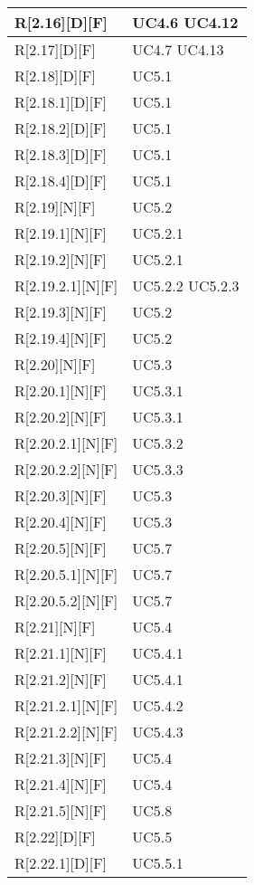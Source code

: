 \begin{longtable}{X | X}
\hline
R[2.16][D][F] & UC4.6 \newline UC4.12 \\
\hline
R[2.17][D][F] & UC4.7 \newline UC4.13 \\
\hline
R[2.18][D][F] & UC5.1 \\
\hline
R[2.18.1][D][F] & UC5.1 \\
\hline
R[2.18.2][D][F] & UC5.1 \\
\hline
R[2.18.3][D][F] & UC5.1 \\
\hline
R[2.18.4][D][F] & UC5.1 \\
\hline
R[2.19][N][F] & UC5.2 \\
\hline
R[2.19.1][N][F] & UC5.2.1 \\
\hline
R[2.19.2][N][F] & UC5.2.1 \\
\hline
R[2.19.2.1][N][F] & UC5.2.2 \newline UC5.2.3 \\
\hline
R[2.19.3][N][F] & UC5.2 \\
\hline
R[2.19.4][N][F] & UC5.2 \\
\hline
R[2.20][N][F] & UC5.3 \\
\hline
R[2.20.1][N][F] & UC5.3.1 \\
\hline
R[2.20.2][N][F] & UC5.3.1 \\
\hline
R[2.20.2.1][N][F] & UC5.3.2 \\
\hline
R[2.20.2.2][N][F] & UC5.3.3 \\
\hline
R[2.20.3][N][F] & UC5.3 \\
\hline
R[2.20.4][N][F] & UC5.3 \\
\hline
R[2.20.5][N][F] & UC5.7 \\
\hline
R[2.20.5.1][N][F] & UC5.7 \\
\hline
R[2.20.5.2][N][F] & UC5.7 \\
\hline
R[2.21][N][F] & UC5.4 \\
\hline
R[2.21.1][N][F] & UC5.4.1 \\
\hline
R[2.21.2][N][F] & UC5.4.1 \\
\hline
R[2.21.2.1][N][F] & UC5.4.2 \\
\hline
R[2.21.2.2][N][F] & UC5.4.3 \\
\hline
R[2.21.3][N][F] & UC5.4 \\
\hline
R[2.21.4][N][F] & UC5.4 \\
\hline
R[2.21.5][N][F] & UC5.8 \\
\hline
R[2.22][D][F] & UC5.5 \\
\hline
R[2.22.1][D][F] & UC5.5.1 \\

\end{longtable}
